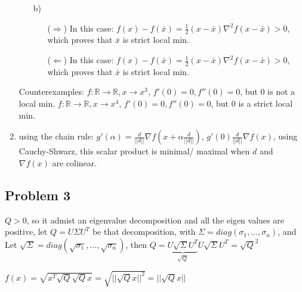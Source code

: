 \documentclass[12pt]{article}
\newcommand{\Problem}[1]{\subsection*{Problem #1}}
\begin{document}
\begin{enumerate}
\begin{enumerate}
  \item[b)]
  \begin{enumerate}
  \item[($\Rightarrow$)]
    In this case: $f(x) - f(\bar x) = \frac12 (x-\bar x) \nabla^2 f(x - \bar x) > 0$, which proves that $\bar x$ is strict local min.
  \item[($\Leftarrow$)]
    In this case: $f(x) - f(\bar x) = \frac12 (x-\bar x) \nabla^2 f(x - \bar x) > 0$, which proves that $\bar x$ is strict local min.
  \end{enumerate}
\end{enumerate}

  Counterexamples:
  $f: \mathbb R \rightarrow \mathbb R, x \rightarrow x^3$, $f'(0) = 0, f''(0) = 0$, but $0$ is not a local min.
  $f: \mathbb R \rightarrow \mathbb R, x \rightarrow x^4$, $f'(0) = 0, f''(0) = 0$, but $0$ is a strict local min.
\item using the chain rule: $g'(\alpha) = \frac{d}{||d||} \nabla f(x + \alpha \frac{d}{||d||})$, $g'(0) \frac{d}{||d||}\nabla f(x)$, using Cauchy-Shwarz, this scalar product is minimal/ maximal when $d$ and $\nabla f(x)$ are colinear.
\end{enumerate}

\Problem{3}
$Q > 0$, so it admist an eigenvalue decomposition and all the eigen values are positive, let $Q = U\Sigma U^T$ be that decomposition, with $\Sigma = diag(\sigma_1, \ldots, \sigma_n)$, and Let $\sqrt{\Sigma} =diag(\sqrt{\sigma_1}, \ldots, \sqrt{\sigma_n})$, then $Q = \underbrace{U\sqrt{\Sigma}U^T}_{\sqrt Q}U\sqrt{\Sigma}U^T = \sqrt{Q}^2$

$f(x) = \sqrt{ x^T\sqrt{Q}\sqrt{Q}x} = \sqrt{ ||\sqrt Q x||^2} = ||\sqrt Q x||$
\end{document}
